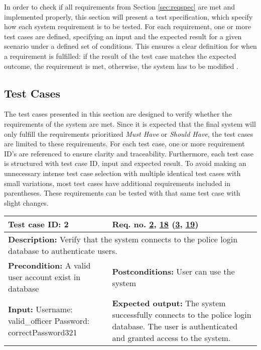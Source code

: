 In order to check if all requirements from Section \ref{sec:reqspec} are met and implemented properly, this section will present a test specification, which specify how each system requirement is to be tested. For each requirement, one or more test cases are defined, specifying an input and the expected result for a given scenario under a defined set of conditions. This ensures a clear definition for when a requirement is fulfilled: if the result of the test case matches the expected outcome, the requirement is met, otherwise, the system has to be modified \cite{testspec_geek}.

\subsection{Test Cases}
The test cases presented in this section are designed to verify whether the requirements of the system are met. Since it is expected that the final system will only fulfill the requirements prioritized \textit{Must Have} or \textit{Should Have}, the test cases are limited to these requirements. 
For each test case, one or more requirement ID's are referenced to ensure clarity and traceability. Furthermore, each test case is structured with test case ID, input and expected result. To avoid making an unnecessary intense test case selection with multiple identical test cases with small variations, most test cases have additional requirements included in parentheses. These requirements can be tested with that same test case with slight changes.
\begin{table}[H]
\begin{tabular}{|p{7cm}|p{7cm}|}
\hline
\rowcolor[HTML]{D8E9F7} 
\textbf{Test case ID: 2} & \textbf{Req. no. \hyperlink{req:2}{2}, \hyperlink{req:18}{18} (\hyperlink{req:3}{3}, \hyperlink{req:19}{19})}\\ \hline

\multicolumn{2}{|p{14cm}|}{\textbf{Description:} \newline Verify that the system connects to the police login database to authenticate users.} \\ \hline

\textbf{Precondition:} \newline A valid user account exist in database & 
\textbf{Postconditions:} \newline User can use the system \\ \hline

\textbf{Input:} \newline
Username: valid\_officer \newline
Password: correctPassword321&
\textbf{Expected output:} \newline
The system successfully connects to the police login database. \newline
The user is authenticated and granted access to the system. \\ \hline
\end{tabular}
\end{table}

